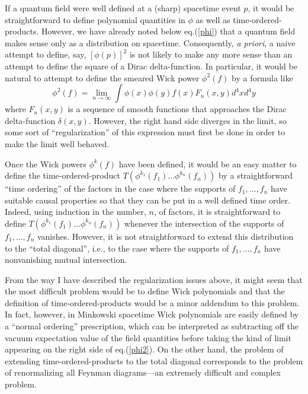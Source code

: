 If a quantum field were well defined at a (sharp) spacetime event $p$,
it would be straightforward to define polynomial quantities in $\phi$
as well as time-ordered-products. However, we have already noted below
eq.(\ref{phi}) that a quantum field makes sense only as a distribution
on spacetime. Consequently, {\it a priori}, a naive attempt to define,
say, $[\phi(p)]^2$ is not likely to make any more sense than an
attempt to define the square of a Dirac delta-function. In particular,
it would be natural to attempt to define the smeared Wick power
$\phi^2 (f)$ by a formula like
\begin{equation}
\phi^2 (f) = \lim_{n \rightarrow \infty} 
\int \phi(x) \phi(y) f(x) F_n (x,y) d^4 x d^4 y
\label{phi2}
\end{equation}
where $F_n(x,y)$ is a sequence of smooth functions that approaches the
Dirac delta-function $\delta(x,y)$. However, the right hand side
diverges in the limit, so some sort of ``regularization'' of this
expression must first be done in order to make the limit well behaved.

Once the Wick powers $\phi^k (f)$ have been defined, it would be an
easy matter to define the time-ordered-product $T(\phi^{k_1} (f_1)
\dots \phi^{k_n} (f_n))$ by a straightforward ``time ordering'' of the
factors in the case where the supports of $f_1, \dots, f_n$
have suitable causal properties so that they can be put in a well
defined time order. Indeed, using induction in the number, $n$, of
factors, it is straightforward to define $T(\phi^{k_1} (f_1) \dots
\phi^{k_n} (f_n))$ whenever the intersection of the supports of $f_1,
\dots, f_n$ vanishes. However, it is not straightforward to extend
this distribution to the ``total diagonal'', i.e., to the case where
the supports of $f_1, \dots, f_n$ have nonvanishing mutual
intersection.

From the way I have described the regularization issues above, it
might seem that the most difficult problem would be to define Wick
polynomials and that the definition of time-ordered-products would be
a minor addendum to this problem. In fact, however, in Minkowski
spacetime Wick polynomials are easily defined by a ``normal ordering''
prescription, which can be interpreted as subtracting off the vacuum
expectation value of the field quantities before taking the kind of
limit appearing on the right side of eq.(\ref{phi2}). On the other
hand, the problem of extending time-ordered-products to the total
diagonal corresponds to the problem of renormalizing all Feynman
diagrams---an extremely difficult and complex problem.


